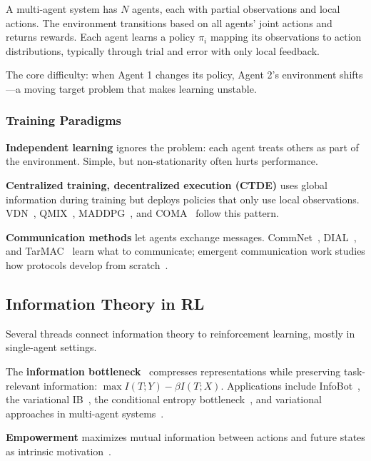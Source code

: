 \documentclass[10pt, letterpaper]{article}
\begin{document}
A multi-agent system has $N$ agents, each with partial observations and local actions. The environment transitions based on all agents' joint actions and returns rewards. Each agent learns a policy $\pi_i$ mapping its observations to action distributions, typically through trial and error with only local feedback.

The core difficulty: when Agent 1 changes its policy, Agent 2's environment shifts---a moving target problem that makes learning unstable.

\subsubsection*{Training Paradigms}

\textbf{Independent learning} ignores the problem: each agent treats others as part of the environment. Simple, but non-stationarity often hurts performance.

\textbf{Centralized training, decentralized execution (CTDE)} uses global information during training but deploys policies that only use local observations. VDN~\cite{sunehag2018vdn}, QMIX~\cite{rashid2018qmix}, MADDPG~\cite{lowe2017maddpg}, and COMA~\cite{foerster2018coma} follow this pattern.

\textbf{Communication methods} let agents exchange messages. CommNet~\cite{sukhbaatar2016}, DIAL~\cite{foerster2016}, and TarMAC~\cite{das2019tarmac} learn what to communicate; emergent communication work studies how protocols develop from scratch~\cite{lazaridou2017emergent,eccles2019biases}.

\subsection{Information Theory in RL}

Several threads connect information theory to reinforcement learning, mostly in single-agent settings.

The \textbf{information bottleneck}~\cite{tishby2015deep} compresses representations while preserving task-relevant information: $\max I(T;Y) - \beta I(T;X)$. Applications include InfoBot~\cite{goyal2019infobot}, the variational IB~\cite{alemi2017vib}, the conditional entropy bottleneck~\cite{fischer2020ceb}, and variational approaches in multi-agent systems~\cite{igl2019deepvariational}.

\textbf{Empowerment} maximizes mutual information between actions and future states as intrinsic motivation~\cite{klyubin2005,mohamed2015empowerment,eysenbach2018diayn}.
\end{document}
